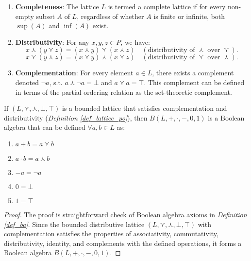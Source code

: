 \begin{definition}
\begin{enumerate}[label=(\roman*), start=4]
    \item \textbf{Completeness}: The lattice \(L\) is termed a complete lattice if for every non-empty subset \(A\) of \(L\), regardless of whether \(A\) is finite or infinite, both \(\sup(A)\) and \(\inf(A)\) exist.
    
    \item \textbf{Distributivity}: For any \( x, y, z \in P \), we have:
    \[
    x \curlywedge (y \curlyvee z) = (x \curlywedge y) \curlyvee (x \curlywedge z) \quad (\text{distributivity of } \curlywedge \text{ over } \curlyvee).
    \]
    \[
    x \curlyvee (y \curlywedge z) = (x \curlyvee y) \curlywedge (x \curlyvee z) \quad (\text{distributivity of } \curlyvee \text{ over } \curlywedge).
    \]

    \item \textbf{Complementation}: For every element $a \in L$, there exists a complement denoted $\neg a$, s.t. $a \curlywedge \neg a = \bot$ and $a \curlyvee a = \top$. This complement can be defined in terms of the partial ordering relation as the set-theoretic complement.
  \end{enumerate}
\end{definition}

\begin{lemma}\label{lemma_ba_from_lattice}
  If $(L, \curlyvee, \curlywedge, \bot, \top)$ is a bounded lattice that satisfies complementation and distributivity (\textit{Definition \ref{def_lattice_po}}), then $B(L, +, \cdot, -, 0, 1)$ is a Boolean algebra that can be defined $\forall a,b \in L$ as:
    \begin{enumerate}[label=(\alph*)]
      \item $a + b = a \curlyvee b$
      \item $a \cdot b = a \curlywedge b$
      \item $-a = \neg a$
      \item $0 = \bot$
      \item $1 = \top$
    \end{enumerate}
\end{lemma}
\begin{proof}
  The proof is straightforward check of Boolean algebra axioms in \textit{Definition \ref{def_ba}}. Since the bounded distributive lattice $(L, \curlyvee, \curlywedge, \bot, \top)$ with complementation satisfies the properties of associativity, commutativity, distributivity, identity, and complements with the defined operations, it forms a Boolean algebra $B(L, +, \cdot, -, 0, 1)$.
\end{proof}

